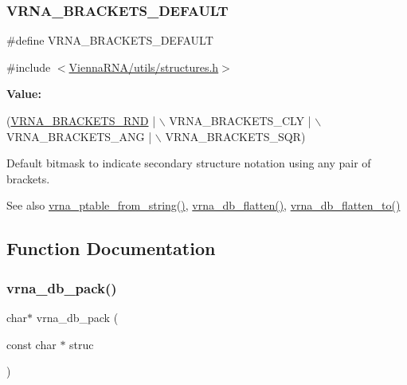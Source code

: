 \subsubsection{\texorpdfstring{V\+R\+N\+A\+\_\+\+B\+R\+A\+C\+K\+E\+T\+S\+\_\+\+D\+E\+F\+A\+U\+LT}{VRNA\_BRACKETS\_DEFAULT}}
{\footnotesize\ttfamily \#define V\+R\+N\+A\+\_\+\+B\+R\+A\+C\+K\+E\+T\+S\+\_\+\+D\+E\+F\+A\+U\+LT}



{\ttfamily \#include $<$\hyperlink{utils_2structures_8h}{Vienna\+R\+N\+A/utils/structures.\+h}$>$}

{\bfseries Value\+:}
\begin{DoxyCode}
(\hyperlink{group__struct__utils__dot__bracket_gac92d5fa7c6625bce2670ece510a24fbd}{VRNA\_BRACKETS\_RND} | \(\backslash\)
   VRNA\_BRACKETS\_CLY | \(\backslash\)
   VRNA\_BRACKETS\_ANG | \(\backslash\)
   VRNA\_BRACKETS\_SQR)
\end{DoxyCode}


Default bitmask to indicate secondary structure notation using any pair of brackets. 

\begin{DoxySeeAlso}{See also}
\hyperlink{group__struct__utils__pair__table_gac76c9ef3de507748fb0416a59323362b}{vrna\+\_\+ptable\+\_\+from\+\_\+string()}, \hyperlink{group__struct__utils__dot__bracket_gae966b9f44168a4f4b39ca42ffb5f37b7}{vrna\+\_\+db\+\_\+flatten()}, \hyperlink{group__struct__utils__dot__bracket_ga690425199c8b71545e7196e3af1436f8}{vrna\+\_\+db\+\_\+flatten\+\_\+to()} 
\end{DoxySeeAlso}


\subsection{Function Documentation}
\mbox{\label{group__struct__utils__dot__bracket_ga55c4783060a1464f862f858d5599c9e1}} 
\subsubsection{\texorpdfstring{vrna\+\_\+db\+\_\+pack()}{vrna\_db\_pack()}}
{\footnotesize\ttfamily char$\ast$ vrna\+\_\+db\+\_\+pack (\begin{DoxyParamCaption}\item[{const char $\ast$}]{struc }\end{DoxyParamCaption})}



